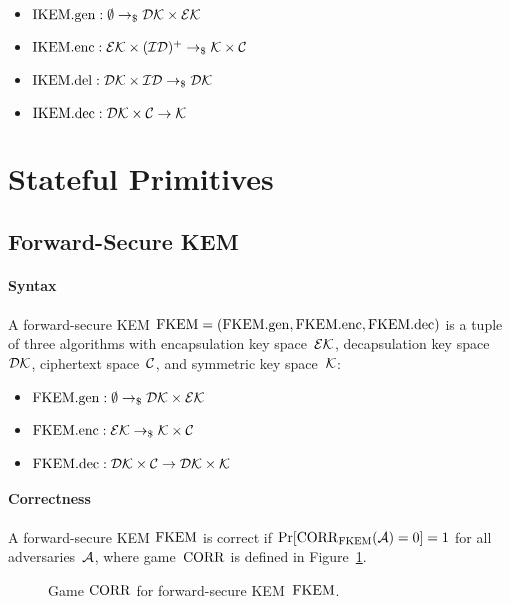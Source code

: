 \documentclass[a4paper,orivec]{llncs}
\begin{document}
\begin{itemize}
    \item $\mathrm{IKEM}.\mathrm{gen}: \emptyset \to_\$ \mathcal{DK}\times\mathcal{EK}$
    \item $\mathrm{IKEM}.\mathrm{enc}: \mathcal{EK}\times(\mathcal{ID})^+ \to_\$ \mathcal{K}\times\mathcal{C}$
    \item $\mathrm{IKEM}.\mathrm{del}: \mathcal{DK}\times\mathcal{ID} \to_\$ \mathcal{DK}$
    \item $\mathrm{IKEM}.\mathrm{dec}: \mathcal{DK}\times\mathcal{C} \to \mathcal{K}$
\end{itemize}


\section{Stateful Primitives}

\subsection{Forward-Secure KEM}

\paragraph{Syntax}
A forward-secure KEM $\mathrm{FKEM}=(\mathrm{FKEM}.\mathrm{gen},\mathrm{FKEM}.\mathrm{enc},\mathrm{FKEM}.\mathrm{dec})$ is a tuple of three algorithms with encapsulation key space~$\mathcal{EK}$, decapsulation key space~$\mathcal{DK}$, ciphertext space~$\mathcal{C}$, and symmetric key space~$\mathcal{K}$:

\begin{itemize}
    \item $\mathrm{FKEM}.\mathrm{gen}: \emptyset \to_\$ \mathcal{DK}\times\mathcal{EK}$
    \item $\mathrm{FKEM}.\mathrm{enc}: \mathcal{EK} \to_\$ \mathcal{K}\times\mathcal{C}$
    \item $\mathrm{FKEM}.\mathrm{dec}: \mathcal{DK}\times\mathcal{C} \to \mathcal{DK}\times\mathcal{K}$
\end{itemize}

\paragraph{Correctness}
A forward-secure KEM $\mathrm{FKEM}$ is correct if $\Pr[\mathrm{CORR}_{\mathrm{FKEM}}(\mathcal{A})=0]=1$ for all adversaries~$\mathcal{A}$, where game~$\mathrm{CORR}$ is defined in Figure~\ref{fig:fkem:corr}.

\begin{figure}[!ht]
    \centering
    \nicoresetlinenr%
    \fbox{%
        \scalebox{\codescalefactor}{%
        }%
    }
    \caption{%
        Game $\mathrm{CORR}$ for forward-secure KEM~$\mathrm{FKEM}$.
    }
    \label{fig:fkem:corr}
\end{figure}
\end{document}
